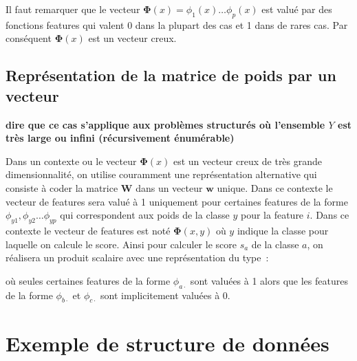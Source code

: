 \documentclass[11pt,openany]{book}
\begin{document}
Il faut remarquer que le vecteur $\boldsymbol\Phi(x) = \phi_1(x) \ldots \phi_p(x)$ est valué par des fonctions features qui valent 0 dans la plupart des cas et 1 dans de rares cas. 
Par  conséquent $\boldsymbol\Phi(x)$ est un vecteur creux.



\subsection{Représentation de la matrice de poids par un vecteur}

{\bf dire que ce cas s'applique aux problèmes structurés où
  l'ensemble $Y$ est très large ou infini (récursivement énumérable)}


Dans un contexte ou le vecteur $\boldsymbol\Phi(x)$
est un vecteur creux de très grande dimensionnalité, 
on utilise couramment une représentation alternative qui consiste à coder la matrice $\mathbf{W}$ dans un vecteur $\mathbf{w}$ unique. Dans ce contexte le vecteur 
de features sera valué à 1 uniquement pour certaines features de la forme $\phi_{y1},\phi_{y2}\ldots \phi_{yp}$ qui correspondent aux poids de la classe $y$ pour la feature $i$. Dans ce contexte le vecteur de features est noté $\boldsymbol\Phi(x,y)$ où $y$ indique la classe pour laquelle on calcule le score.
Ainsi pour calculer le score $s_a$ de la classe $a$,  on réalisera un produit scalaire avec une représentation du type~:
\begin{center}
\end{center}
où seules certaines features de la forme $\phi_{a\cdot}$ sont valuées à 1 alors que les features de la forme $\phi_{b\cdot}$ et $\phi_{c\cdot}$ sont implicitement valuées à 0.

\section{Exemple de structure de données}
\end{document}
